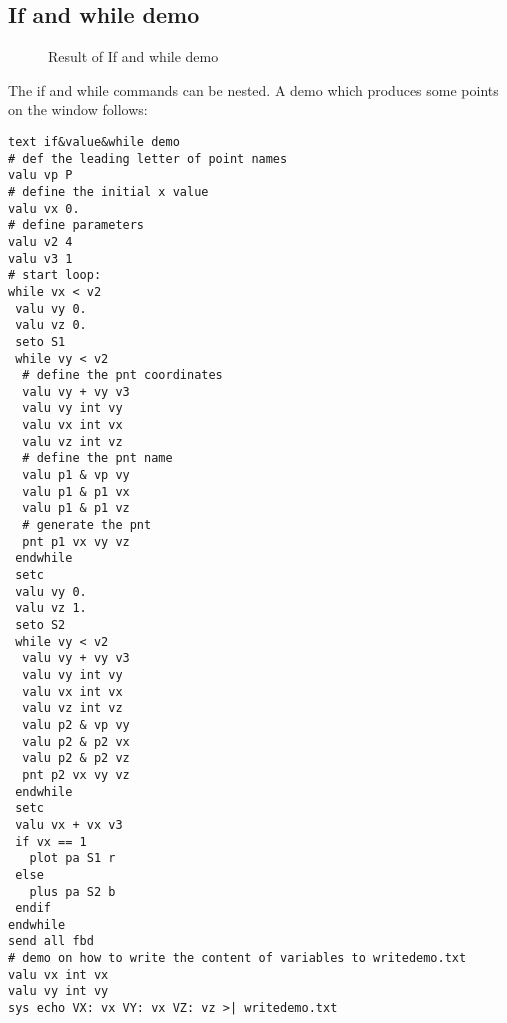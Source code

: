 \documentclass{article}
\begin{document}
\begin{appendix}
\subsection{\label{If and while demo}If and while demo}
\begin{figure}[h]
\caption{\label{Result of If and while demo}Result of If and while demo}
\end{figure}
The if and while commands can be nested. A demo which produces some points on the window follows:
\begin{verbatim}
text if&value&while demo
# def the leading letter of point names
valu vp P
# define the initial x value
valu vx 0.
# define parameters
valu v2 4
valu v3 1
# start loop:
while vx < v2
 valu vy 0.
 valu vz 0.
 seto S1
 while vy < v2
  # define the pnt coordinates
  valu vy + vy v3
  valu vy int vy
  valu vx int vx
  valu vz int vz
  # define the pnt name
  valu p1 & vp vy
  valu p1 & p1 vx
  valu p1 & p1 vz
  # generate the pnt
  pnt p1 vx vy vz
 endwhile
 setc
 valu vy 0.
 valu vz 1.
 seto S2
 while vy < v2
  valu vy + vy v3
  valu vy int vy
  valu vx int vx
  valu vz int vz
  valu p2 & vp vy
  valu p2 & p2 vx
  valu p2 & p2 vz
  pnt p2 vx vy vz
 endwhile
 setc
 valu vx + vx v3
 if vx == 1
   plot pa S1 r
 else
   plus pa S2 b
 endif
endwhile
send all fbd
# demo on how to write the content of variables to writedemo.txt
valu vx int vx
valu vy int vy
sys echo VX: vx VY: vx VZ: vz >| writedemo.txt
\end{verbatim}



\end{appendix}
\end{document}
